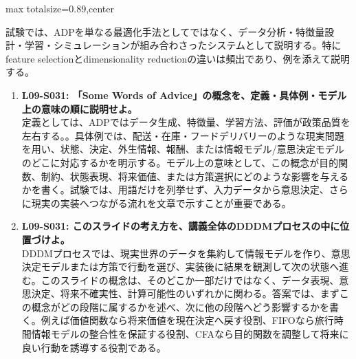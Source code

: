 \begin{minipage}[t]{0.58\textwidth}
\begin{adjustbox}{max totalsize={\textwidth}{0.89\textheight},center}
\begin{minipage}{\textwidth}
試験では、ADPを単なる最適化手法としてではなく、データ分析・特徴量設計・学習・シミュレーションが組み合わさったシステムとして説明する。特にfeature selectionとdimensionality reductionの違いは頻出であり、例を添えて説明する。\par{}\begin{enumerate}\item \textbf{L09-S031: 「Some Words of Advice」の概念を、定義・具体例・モデル上の意味の順に説明せよ。}\\定義としては、ADPではデータ生成、特徴量、学習方法、評価が政策品質を左右する。。具体例では、配送・在庫・フードデリバリーのような現実問題を用い、状態、決定、外生情報、報酬、または情報モデル/意思決定モデルのどこに対応するかを明示する。モデル上の意味として、この概念が目的関数、制約、状態表現、将来価値、または方策選択にどのような影響を与えるかを書く。試験では、用語だけを列挙せず、入力データから意思決定、さらに現実の実装へつながる流れを文章で示すことが重要である。\item \textbf{L09-S031: このスライドの考え方を、講義全体のDDDMプロセスの中に位置づけよ。}\\DDDMプロセスでは、現実世界のデータを集約して情報モデルを作り、意思決定モデルまたは方策で行動を選び、実装後に結果を観測して次の状態へ進む。このスライドの概念は、そのどこか一部だけではなく、データ表現、意思決定、将来不確実性、計算可能性のいずれかに関わる。答案では、まずこの概念がどの段階に属するかを述べ、次に他の段階へどう影響するかを書く。例えば価値関数なら将来価値を現在決定へ戻す役割、FIFOなら旅行時間情報モデルの整合性を保証する役割、CFAなら目的関数を調整して将来に良い行動を誘導する役割である。\end{enumerate}
\end{minipage}
\end{adjustbox}
\end{minipage}


